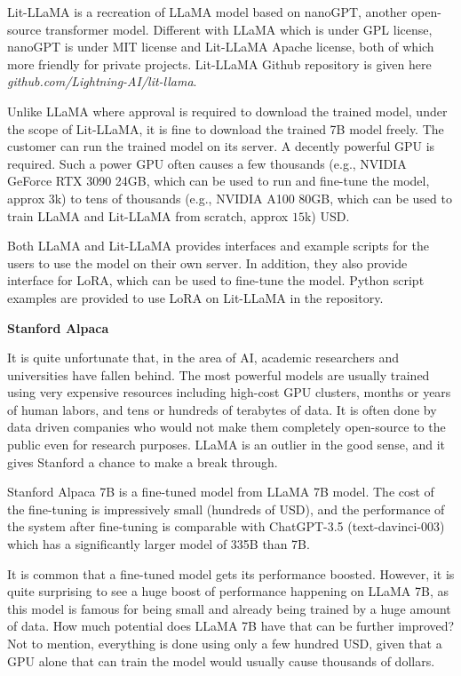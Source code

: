 Lit-LLaMA is a recreation of LLaMA model based on nanoGPT, another open-source transformer model. Different with LLaMA which is under GPL license, nanoGPT is under MIT license and Lit-LLaMA Apache license, both of which more friendly for private projects. Lit-LLaMA Github repository is given here \textit{github.com/Lightning-AI/lit-llama}. 

Unlike LLaMA where approval is required to download the trained model, under the scope of Lit-LLaMA, it is fine to download the trained 7B model freely. The customer can run the trained model on its server. A decently powerful GPU is required. Such a power GPU often causes a few thousands (e.g., NVIDIA GeForce RTX 3090 24GB, which can be used to run and fine-tune the model, approx $3$k) to tens of thousands (e.g., NVIDIA A100 80GB, which can be used to train LLaMA and Lit-LLaMA from scratch, approx $15$k) USD.

Both LLaMA and Lit-LLaMA provides interfaces and example scripts for the users to use the model on their own server. In addition, they also provide interface for LoRA, which can be used to fine-tune the model. Python script examples are provided to use LoRA on Lit-LLaMA in the repository.

\vspace{0.1in}
\noindent \textbf{Stanford Alpaca}
\vspace{0.1in}

It is quite unfortunate that, in the area of AI, academic researchers and universities have fallen behind. The most powerful models are usually trained using very expensive resources including high-cost GPU clusters, months or years of human labors, and tens or hundreds of terabytes of data. It is often done by data driven companies who would not make them completely open-source to the public even for research purposes. LLaMA is an outlier in the good sense, and it gives Stanford a chance to make a break through.

Stanford Alpaca 7B is a fine-tuned model from LLaMA 7B model. The cost of the fine-tuning is impressively small (hundreds of USD), and the performance of the system after fine-tuning is comparable with ChatGPT-3.5 (text-davinci-003) which has a significantly larger model of 335B than 7B.

It is common that a fine-tuned model gets its performance boosted. However, it is quite surprising to see a huge boost of performance happening on LLaMA 7B, as this model is famous for being small and already being trained by a huge amount of data. How much potential does LLaMA 7B have that can be further improved? Not to mention, everything is done using only a few hundred USD, given that a GPU alone that can train the model would usually cause thousands of dollars.  

